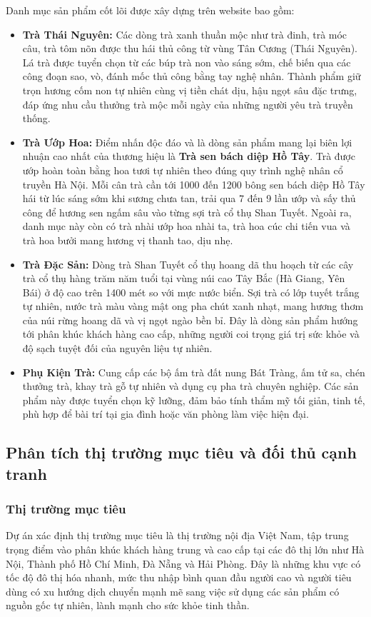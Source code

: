 Danh mục sản phẩm cốt lõi được xây dựng trên website bao gồm:
\begin{itemize}
    \item \textbf{Trà Thái Nguyên:} Các dòng trà xanh thuần mộc như trà đinh, trà móc câu, trà tôm nõn được thu hái thủ công từ vùng Tân Cương (Thái Nguyên). Lá trà được tuyển chọn từ các búp trà non vào sáng sớm, chế biến qua các công đoạn sao, vò, đánh mốc thủ công bằng tay nghệ nhân. Thành phẩm giữ trọn hương cốm non tự nhiên cùng vị tiền chát dịu, hậu ngọt sâu đặc trưng, đáp ứng nhu cầu thưởng trà mộc mỗi ngày của những người yêu trà truyền thống.
    \item \textbf{Trà Ướp Hoa:} Điểm nhấn độc đáo và là dòng sản phẩm mang lại biên lợi nhuận cao nhất của thương hiệu là \textbf{Trà sen bách diệp Hồ Tây}. Trà được ướp hoàn toàn bằng hoa tươi tự nhiên theo đúng quy trình nghệ nhân cổ truyền Hà Nội. Mỗi cân trà cần tới 1000 đến 1200 bông sen bách diệp Hồ Tây hái từ lúc sáng sớm khi sương chưa tan, trải qua 7 đến 9 lần ướp và sấy thủ công để hương sen ngấm sâu vào từng sợi trà cổ thụ Shan Tuyết. Ngoài ra, danh mục này còn có trà nhài ướp hoa nhài ta, trà hoa cúc chi tiến vua và trà hoa bưởi mang hương vị thanh tao, dịu nhẹ.
    \item \textbf{Trà Đặc Sản:} Dòng trà Shan Tuyết cổ thụ hoang dã thu hoạch từ các cây trà cổ thụ hàng trăm năm tuổi tại vùng núi cao Tây Bắc (Hà Giang, Yên Bái) ở độ cao trên 1400 mét so với mực nước biển. Sợi trà có lớp tuyết trắng tự nhiên, nước trà màu vàng mật ong pha chút xanh nhạt, mang hương thơm của núi rừng hoang dã và vị ngọt ngào bền bỉ. Đây là dòng sản phẩm hướng tới phân khúc khách hàng cao cấp, những người coi trọng giá trị sức khỏe và độ sạch tuyệt đối của nguyên liệu tự nhiên.
    \item \textbf{Phụ Kiện Trà:} Cung cấp các bộ ấm trà đất nung Bát Tràng, ấm tử sa, chén thưởng trà, khay trà gỗ tự nhiên và dụng cụ pha trà chuyên nghiệp. Các sản phẩm này được tuyển chọn kỹ lưỡng, đảm bảo tính thẩm mỹ tối giản, tinh tế, phù hợp để bài trí tại gia đình hoặc văn phòng làm việc hiện đại.
    
\end{itemize}

\subsection{Phân tích thị trường mục tiêu và đối thủ cạnh tranh}

\subsubsection{Thị trường mục tiêu}
Dự án xác định thị trường mục tiêu là thị trường nội địa Việt Nam, tập trung trọng điểm vào phân khúc khách hàng trung và cao cấp tại các đô thị lớn như Hà Nội, Thành phố Hồ Chí Minh, Đà Nẵng và Hải Phòng. Đây là những khu vực có tốc độ đô thị hóa nhanh, mức thu nhập bình quan đầu người cao và người tiêu dùng có xu hướng dịch chuyển mạnh mẽ sang việc sử dụng các sản phẩm có nguồn gốc tự nhiên, lành mạnh cho sức khỏe tinh thần. 


